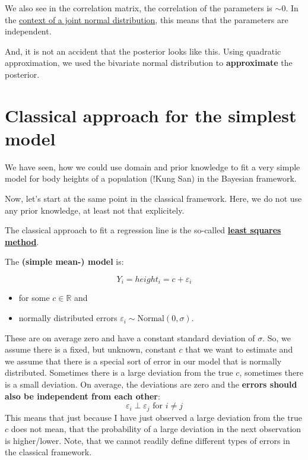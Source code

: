 \documentclass[
]{book}
\providecommand{\tightlist}{%
  \setlength{\itemsep}{0pt}\setlength{\parskip}{0pt}}
\begin{document}
We also see in the correlation matrix, the correlation of the parameters is \(\sim 0\).
In the \href{https://en.wikipedia.org/wiki/Correlation\#Correlation_and_independence}{context of a joint normal distribution},
this means that the parameters are independent.

And, it is not an accident that the posterior looks like this. Using quadratic approximation,
we used the bivariate normal distribution to \textbf{approximate} the posterior.

\section{Classical approach for the simplest model}\label{classical-approach-for-the-simplest-model}

We have seen, how we could use domain and prior knowledge to fit a very simple model
for body heights of a population (!Kung San) in the Bayesian framework.

Now, let's start at the same point in the classical framework.
Here, we do not use any prior knowledge, at least not that explicitely.

The classical approach to fit a regression line is the so-called
\textbf{\href{https://en.wikipedia.org/wiki/Least_squares}{least squares method}}.

The \textbf{(simple mean-) model} is:

\[ Y_i = height_i = c + \varepsilon_i \]

\begin{itemize}
\tightlist
\item
  for some \(c \in \mathbb{R}\) and
\item
  normally distributed errors \(\varepsilon_i \sim \text{Normal}(0, \sigma)\).
\end{itemize}

These are on average zero and have a constant standard deviation of \(\sigma\).
So, we assume there is a fixed, but unknown, constant \(c\) that we want to estimate and we
assume that there is a special sort of error in our model that is normally distributed.
Sometimes there is a large deviation from the true \(c\), sometimes there is a small deviation.
On average, the deviations are zero and the \textbf{errors should also be independent from each other}:
\[ \varepsilon_i \perp \varepsilon_j \text{ for } i \neq j\]
This means that just because I have just observed a large deviation from the true \(c\)
does not mean, that the probability of a large deviation in the next observation is higher/lower.
Note, that we cannot readily define different types of errors in the classical framework.
\end{document}
